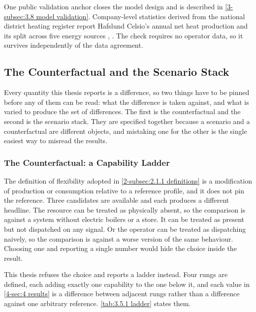 One public validation anchor closes the model design and is described in \autoref{3-subsec:3.8 model validation}. Company-level statistics derived from the national district heating register report Hafslund Celsio's annual net heat production and its split across five energy sources \cite{norsk_fjernvarme_fjernkontrollenno_nodate}, \cite{norsk_fjernvarme_fakta_nodate}. The check requires no operator data, so it survives independently of the data agreement.

\subsection{The Counterfactual and the Scenario Stack}
\label{3-subsec:3.5 counterfactual and stack}

Every quantity this thesis reports is a difference, so two things have to be pinned before any of them can be read: what the difference is taken against, and what is varied to produce the set of differences. The first is the counterfactual and the second is the scenario stack. They are specified together because a scenario and a counterfactual are different objects, and mistaking one for the other is the single easiest way to misread the results.

\subsubsection{The Counterfactual: a Capability Ladder}
\label{3-subsec:3.5.1 ladder}

The definition of flexibility adopted in \autoref{2-subsec:2.1.1 definitions} is a modification of production or consumption relative to a reference profile, and it does not pin the reference. Three candidates are available and each produces a different headline. The resource can be treated as physically absent, so the comparison is against a system without electric boilers or a store. It can be treated as present but not dispatched on any signal. Or the operator can be treated as dispatching naively, so the comparison is against a worse version of the same behaviour. Choosing one and reporting a single number would hide the choice inside the result.

This thesis refuses the choice and reports a ladder instead. Four rungs are defined, each adding exactly one capability to the one below it, and each value in \autoref{4-sec:4 results} is a difference between adjacent rungs rather than a difference against one arbitrary reference. \autoref{tab:3.5.1 ladder} states them.

